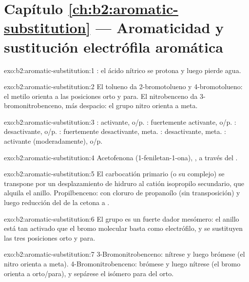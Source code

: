 \section*{Capítulo \ref{ch:b2:aromatic-substitution} --- Aromaticidad y sustitución electrófila aromática}

\begin{solution}{exo:b2:aromatic-substitution:1}
: el ácido nítrico se protona y luego pierde agua.
\end{solution}

\begin{solution}{exo:b2:aromatic-substitution:2}
El tolueno da 2-bromotolueno y 4-bromotolueno: el metilo orienta a las posiciones orto y
para. El nitrobenceno da 3-bromonitrobenceno, más despacio: el grupo nitro
orienta a meta.
\end{solution}

\begin{solution}{exo:b2:aromatic-substitution:3}
: activante, o/p. : fuertemente activante, o/p. : desactivante, o/p.
: fuertemente desactivante, meta. : desactivante, meta. :
activante (moderadamente), o/p.
\end{solution}

\begin{solution}{exo:b2:aromatic-substitution:4}
Acetofenona (1-feniletan-1-ona), , a través del  .
\end{solution}

\begin{solution}{exo:b2:aromatic-substitution:5}
El carbocatión primario (o su complejo) se transpone por un desplazamiento de hidruro al catión
isopropilo secundario, que alquila el anillo. Propilbenceno:  con
cloruro de propanoílo (sin transposición) y luego reducción del  de la cetona a .
\end{solution}

\begin{solution}{exo:b2:aromatic-substitution:6}
El grupo  es un fuerte dador mesómero: el anillo está tan activado que el bromo molecular
basta como electrófilo, y se sustituyen las tres posiciones orto y para.
\end{solution}

\begin{solution}{exo:b2:aromatic-substitution:7}
3-Bromonitrobenceno: nítrese y luego brómese (el nitro orienta a meta). 4-Bromonitrobenceno:
brómese y luego nítrese (el bromo orienta a orto/para), y sepárese el isómero para del
orto.
\end{solution}

